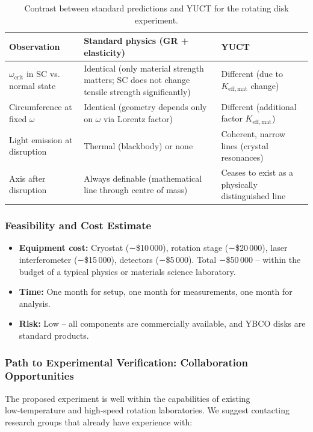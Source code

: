 \documentclass[12pt,a4paper]{article}
\begin{document}
\begin{table}[h]
	\centering
	\caption{Contrast between standard predictions and YUCT for the rotating disk experiment.}
	\label{tab:experiment_predictions}
	\begin{tabular}{p{5cm}p{4cm}p{4cm}}
		\toprule
		\textbf{Observation} & \textbf{Standard physics (GR + elasticity)} & \textbf{YUCT} \\
		\midrule
		\(\omega_{\text{crit}}\) in SC vs. normal state & Identical (only material strength matters; SC does not change tensile strength significantly) & Different (due to \(K_{\mathrm{eff,mat}}\) change) \\
		Circumference at fixed \(\omega\) & Identical (geometry depends only on \(\omega\) via Lorentz factor) & Different (additional factor \(K_{\mathrm{eff,mat}}\)) \\
		Light emission at disruption & Thermal (blackbody) or none & Coherent, narrow lines (crystal resonances) \\
		Axis after disruption & Always definable (mathematical line through centre of mass) & Ceases to exist as a physically distinguished line \\
		\bottomrule
	\end{tabular}
\end{table}

\subsubsection{Feasibility and Cost Estimate}

\begin{itemize}
	\item \textbf{Equipment cost:} Cryostat (∼\$10 000), rotation stage (∼\$20 000), laser interferometer (∼\$15 000), detectors (∼\$5 000). Total ∼\$50 000 – within the budget of a typical physics or materials science laboratory.
	\item \textbf{Time:} One month for setup, one month for measurements, one month for analysis.
	\item \textbf{Risk:} Low – all components are commercially available, and YBCO disks are standard products.
\end{itemize}

\subsubsection{Path to Experimental Verification: Collaboration Opportunities}

The proposed experiment is well within the capabilities of existing low‑temperature and high‑speed rotation laboratories. We suggest contacting research groups that already have experience with:
\end{document}
